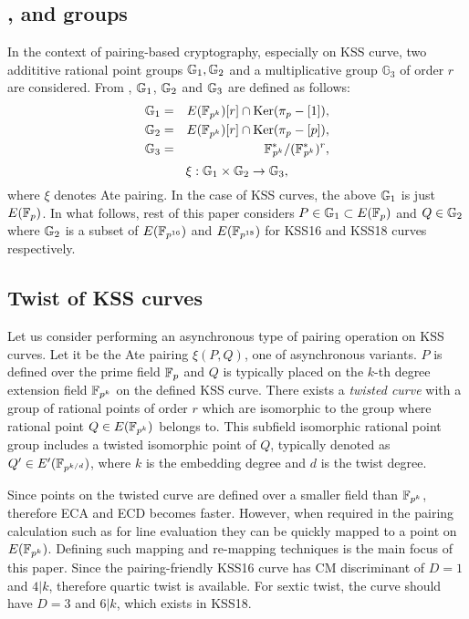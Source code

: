 \subsection{,  and  groups} In the context of pairing-based cryptography, especially on KSS curve, two addititive rational point groups ${\mathbb{G}}_{1}, {\mathbb{G}}_{2}$ and a multiplicative group $\mathbb{G}_3$ of order $r$ are considered. From \cite{mori},  ${\mathbb{G}}_{1}$, ${\mathbb{G}}_{2}$ and ${\mathbb{G}}_{3}$ are defined as follows:
\begin{eqnarray}\label{eq:g1}
{\mathbb{G}}_{1} & = &  E({\mathbb{F}}_{p^{k}}) [r] \cap \text{Ker}(\pi_p - [1]), \nonumber \\
{\mathbb{G}}_{2} & = &  E({\mathbb{F}}_{p^{k}}) [r] \cap \text{Ker}(\pi_p - [p]), \nonumber \\
{\mathbb{G}}_{3} & = & {{\mathbb{F}}^{\ast}}_{\!\!\!p^{k}}/({{\mathbb{F}}^{\ast}}_{\!\!\!p^{k}})^r, \nonumber
\end{eqnarray}
\begin{equation}
\xi : {\mathbb{G}}_{1} \times {\mathbb{G}}_{2} \rightarrow {\mathbb{G}}_{3},
\end{equation}
where $\xi$ denotes Ate pairing. In the case of KSS curves, the above ${\mathbb{G}}_{1}$ is just $E(\mathbb{F}_p)$. In what follows, rest of this paper considers 
 $P \in {\mathbb{G}}_{1} \subset E(\mathbb{F}_p)$ and  $Q \in {\mathbb{G}}_{2}$ where  ${\mathbb{G}}_{2}$ is a subset of $E(\mathbb{F}_{p^{16}})$ and $E(\mathbb{F}_{p^{18}})$ for KSS16 and KSS18 curves respectively. 

\subsection{Twist of KSS curves}
Let us consider performing an asynchronous type of pairing operation on KSS curves.  Let it be the Ate pairing $\xi(P,Q)$, one of asynchronous variants. $P$  is defined over the prime field $\mathbb{F}_p$ and  $Q$ is typically placed on the $k$-th degree extension field $\mathbb{F}_{p^k}$ on the defined KSS curve. There exists a \textit{twisted curve} with a group of rational points of order $r$ which are isomorphic to the group where rational point $Q \in  E(\mathbb{F}_{p^k})$  belongs to. This subfield isomorphic rational point group includes a twisted isomorphic point of $Q$, typically denoted as $Q' \in E'(\mathbb{F}_{p^{k/d}})$, where $k$ is the embedding degree and $d$ is the twist degree.  

Since points on the twisted curve are defined over a smaller field than $\mathbb{F}_{p^k}$, therefore ECA and ECD becomes faster. 
However, when required in the pairing calculation such as  for line evaluation  they can be quickly mapped to a point on $E(\mathbb{F}_{p^k} )$. 
Defining such mapping and re-mapping techniques is the main focus of this  paper. Since the pairing-friendly KSS16 \cite{kss} curve has CM discriminant of $D = 1$ and $4|k$, therefore quartic twist is available. For sextic twist, the curve should have $D = 3$ and $6|k$, which exists in KSS18.

